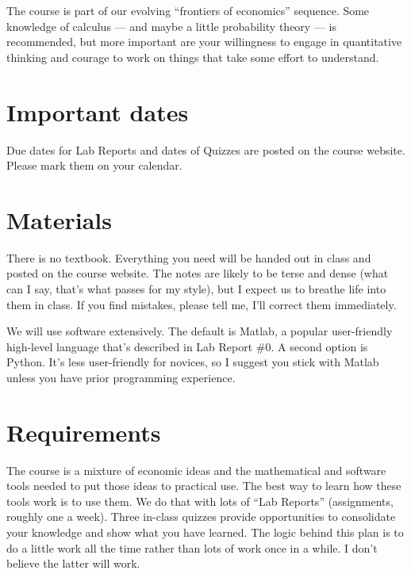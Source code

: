 \documentclass[11pt]{article}
\begin{document}
The course is part of our evolving ``frontiers of economics''
sequence.
Some knowledge of calculus --- and maybe a little probability theory --- is recommended,
but more important are your willingness to engage in quantitative thinking
and courage to work on things that take some effort to understand.


\section*{Important dates}

Due dates for Lab Reports and dates of Quizzes are posted on the course website.
Please mark them on your calendar.

\section*{Materials}

There is no textbook.  Everything you need will be
handed out in class and posted on the course website.
The notes are likely to be terse and dense
(what can I say, that's what passes for my style),
but I expect us to breathe life into them in class.
If you find mistakes, please tell me, I'll correct them immediately.


We will use software extensively.
The default is Matlab, a popular user-friendly high-level language that's described
in  Lab Report \#0.
A second option is Python.  It's less user-friendly for novices,
so I suggest you stick
with Matlab unless you have prior programming experience.


\section*{Requirements}

The course is a mixture of economic ideas and
the mathematical and software tools needed to put those ideas to practical use.
The best way to learn how these tools work is to use them.
We do that with lots of ``Lab Reports'' (assignments, roughly one a week).
Three in-class quizzes provide opportunities to consolidate your knowledge
and show what you have learned.
The logic behind this plan is to do a little work all the time rather than lots of
work once in a while.
I don't believe the latter will work.
\end{document}
